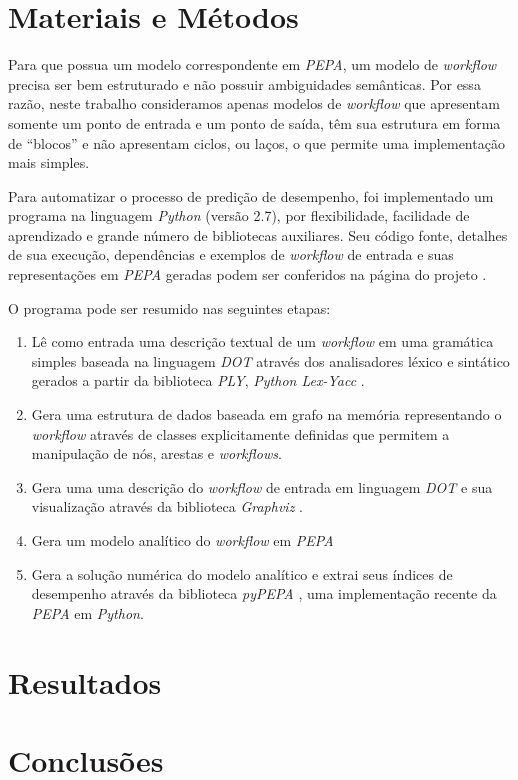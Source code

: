 \documentclass[a4paper,11pt]{article}
\begin{document}
    \section*{Materiais e Métodos}
        Para que possua um modelo correspondente em \emph{PEPA}, um modelo de \emph{workflow} precisa ser bem estruturado e não possuir ambiguidades semânticas. Por essa razão, neste trabalho consideramos apenas modelos de \emph{workflow} que apresentam somente um ponto de entrada e um ponto de saída, têm sua estrutura em forma de ``blocos''  e não apresentam ciclos, ou laços, o que permite uma implementação mais simples.

        Para automatizar o processo de predição de desempenho, foi implementado um programa na linguagem \emph{Python} (versão 2.7), por flexibilidade, facilidade de aprendizado e grande número de bibliotecas auxiliares. Seu código fonte, detalhes de sua execução, dependências e exemplos de \emph{workflow} de entrada e suas representações em \emph{PEPA} geradas podem ser conferidos na página do projeto \cite{web:script}.

        \newpage
        O programa pode ser resumido nas seguintes etapas:

        \begin{enumerate}
            \item Lê como entrada uma descrição textual de um \emph{workflow} em uma gramática simples baseada na linguagem \emph{DOT} \cite{web:dot} através dos analisadores léxico e sintático gerados a partir da biblioteca \emph{PLY}, \emph{Python Lex-Yacc} \cite{web:ply}.
            \item Gera uma estrutura de dados baseada em grafo na memória representando o \emph{workflow} através de classes explicitamente definidas que permitem a manipulação de nós, arestas e \emph{workflows}.
            \item Gera uma uma descrição do \emph{workflow} de entrada em linguagem \emph{DOT} e sua visualização através da biblioteca \emph{Graphviz} \cite{web:graphviz}.
            \item Gera um modelo analítico do \emph{workflow} em \emph{PEPA}
            \item Gera a solução numérica do modelo analítico e extrai seus índices de desempenho através da biblioteca \emph{pyPEPA} \cite{web:pypepa}, uma implementação recente da \emph{PEPA} em \emph{Python}.
        \end{enumerate}

    \section*{Resultados}
    \section*{Conclusões}


    
    
\end{document}
